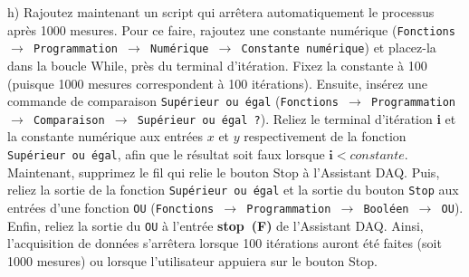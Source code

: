 \documentclass[canadien,12pt,oneside,letterpaper]{article}
\begin{document}
\vspace{1ex}
\noindent{} 
\vspace{1ex}

h) Rajoutez maintenant un script qui arrêtera automatiquement le processus après 1000 mesures. Pour ce faire, rajoutez une constante numérique (\texttt{Fonctions $\rightarrow$ Programmation $\rightarrow$ Numérique $\rightarrow$ Constante numérique}) et placez-la dans la boucle While, près du terminal d'itération. Fixez la constante à 100 (puisque 1000 mesures correspondent à 100 itérations). Ensuite, insérez une commande de comparaison \texttt{Supérieur ou égal} (\texttt{Fonctions $\rightarrow$ Programmation $\rightarrow$ Comparaison $\rightarrow$ Supérieur ou égal~?}). Reliez le terminal d'itération \textbf{i} et la constante numérique aux entrées $x$ et $y$ respectivement de la fonction \texttt{Supérieur ou égal}, afin que le résultat soit faux lorsque $\mathbf{i}<constante$. Maintenant, supprimez le fil qui relie le bouton Stop à l'Assistant DAQ. Puis, reliez la sortie de la fonction \texttt{Supérieur ou égal} et la sortie du bouton \texttt{Stop} aux entrées d'une fonction \texttt{OU} (\texttt{Fonctions $\rightarrow$ Programmation $\rightarrow$ Booléen $\rightarrow$ OU}). Enfin, reliez la sortie du \texttt{OU}  à l'entrée \textbf{stop~(F)} de l'Assistant DAQ. Ainsi, l'acquisition de données s'arrêtera lorsque 100 itérations auront été faites (soit 1000 mesures) ou lorsque l'utilisateur appuiera sur le bouton Stop.
\newpage
\end{document}
